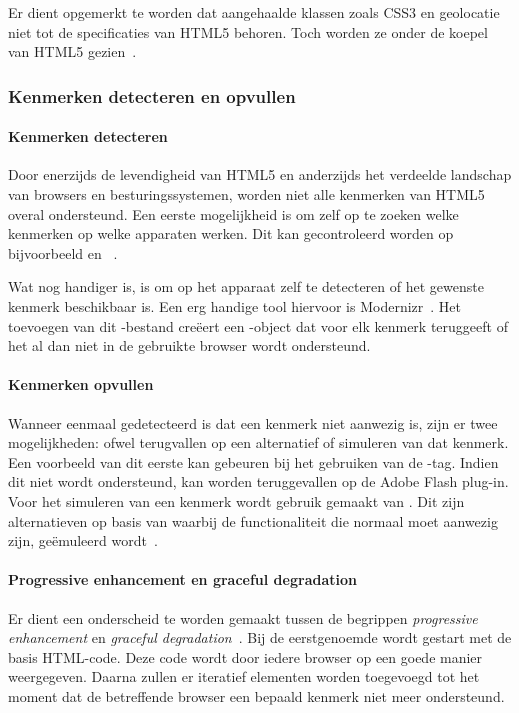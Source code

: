 Er dient opgemerkt te worden dat aangehaalde klassen zoals CSS3 en geolocatie niet tot de specificaties van HTML5 behoren. 
Toch worden ze onder de koepel van HTML5 gezien~\cite{MacDonald2011}.

\subsubsection{Kenmerken detecteren en opvullen}
\paragraph{Kenmerken detecteren}
Door enerzijds de levendigheid van HTML5 en anderzijds het verdeelde landschap van browsers en besturingssystemen, worden niet alle kenmerken van HTML5 overal ondersteund. 
Een eerste mogelijkheid is om zelf op te zoeken welke kenmerken op welke apparaten werken. 
Dit kan gecontroleerd worden op bijvoorbeeld  en ~\cite{MacDonald2011}. 

Wat nog handiger is, is om op het apparaat zelf te detecteren of het gewenste kenmerk beschikbaar is. 
Een erg handige tool hiervoor is Modernizr~\cite{Modernizr2012}. 
Het toevoegen van dit \js{}-bestand creëert een \js{}-object dat voor elk kenmerk teruggeeft of het al dan niet in de gebruikte browser wordt ondersteund.

\paragraph{Kenmerken opvullen}
Wanneer eenmaal gedetecteerd is dat een kenmerk niet aanwezig is, zijn er twee mogelijkheden: ofwel terugvallen op een alternatief of simuleren van dat kenmerk. 
Een voorbeeld van dit eerste kan gebeuren bij het gebruiken van de -tag. 
Indien dit niet wordt ondersteund, kan worden teruggevallen op de Adobe Flash plug-in. 
Voor het simuleren van een kenmerk wordt gebruik gemaakt van . 
Dit zijn alternatieven op basis van \js{} waarbij de  functionaliteit die normaal moet aanwezig zijn, geëmuleerd wordt~\cite{MacDonald2011,Weyl2011}.

\paragraph{Progressive enhancement en graceful degradation}
\label{par:progressive-enhancement}
Er dient een onderscheid te worden gemaakt tussen de begrippen \emph{progressive enhancement} en \emph{graceful degradation}~\cite{Hens2012}. 
Bij de eerstgenoemde wordt gestart met de basis HTML-code.
Deze code wordt door iedere browser op een goede manier weergegeven. 
Daarna zullen er iteratief elementen worden toegevoegd tot het moment dat de betreffende browser een bepaald kenmerk niet meer ondersteund.

